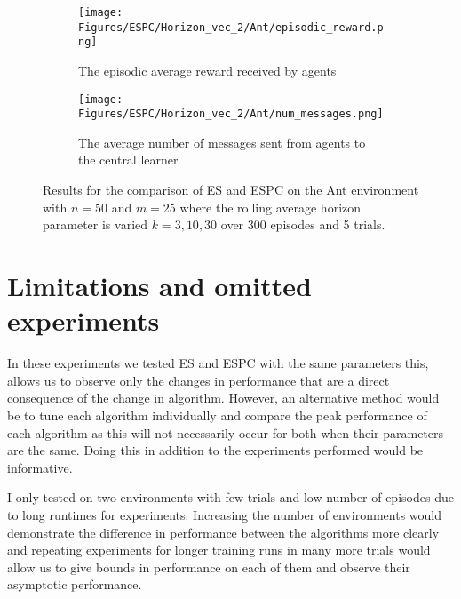 \begin{figure}[H]
    \centering
    \begin{subfigure}{0.4\textwidth}
        \centering
        \texttt{[image: Figures/ESPC/Horizon\_vec\_2/Ant/episodic\_reward.png]}
        \caption{The episodic average reward received by agents}
        \label{fig:AntHorizonEpisodicReward}
    \end{subfigure}
    \begin{subfigure}{0.4\textwidth}
        \centering
        \texttt{[image: Figures/ESPC/Horizon\_vec\_2/Ant/num\_messages.png]}
        \caption{The average number of messages sent from agents to the central learner}
        \label{fig:AntHorizonMessages}
    \end{subfigure}
    \caption{Results for the comparison of ES and ESPC on the Ant environment with $n=50$ and $m=25$ where the rolling average horizon parameter is varied $k=3,10,30$ over 300 episodes and 5 trials.}
    \label{fig:AntHorizon}
\end{figure}


\section{Limitations and omitted experiments}
In these experiments we tested ES and ESPC with the same parameters this, allows us to observe only the changes in performance that are a direct consequence of the change in algorithm. However, an alternative method would be to tune each algorithm individually and compare the peak performance of each algorithm as this will not necessarily occur for both when their parameters are the same. Doing this in addition to the experiments performed would be informative.

I only tested on two environments with few trials and low number of episodes due to long runtimes for experiments. Increasing the number of environments would demonstrate the difference in performance between the algorithms more clearly and repeating experiments for longer training runs in many more trials would allow us to give bounds in performance on each of them and observe their asymptotic performance.

